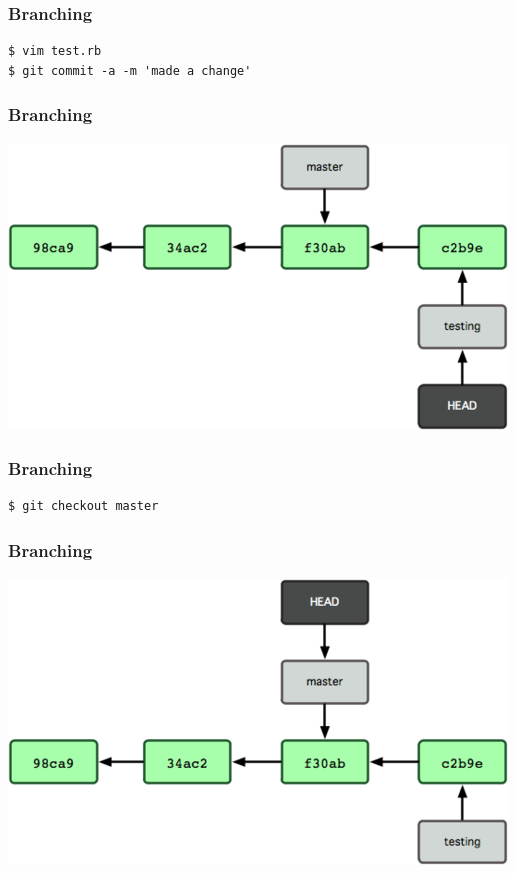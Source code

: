 \documentclass{beamer}
\begin{document}
\begin{frame}[fragile]
\frametitle{Branching}
\begin{lstlisting}
$ vim test.rb
$ git commit -a -m 'made a change'
\end{lstlisting}
\end{frame}

\begin{frame}
\frametitle{Branching}
\begin{center}
  \includegraphics[width=\textwidth,height=0.6\textheight,keepaspectratio]{imgs/branch06.png}
\end{center}
\end{frame}

\begin{frame}[fragile]
\frametitle{Branching}
\begin{lstlisting}
$ git checkout master
\end{lstlisting}
\end{frame}

\begin{frame}
\frametitle{Branching}
\begin{center}
  \includegraphics[width=\textwidth,height=0.6\textheight,keepaspectratio]{imgs/branch07.png}
\end{center}
\end{frame}
\end{document}
